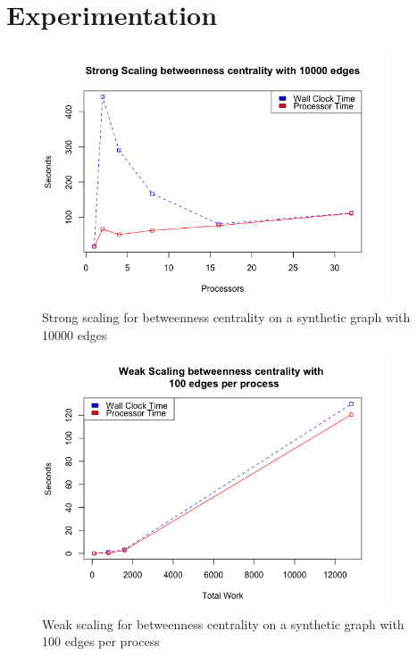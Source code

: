 \documentclass[11pt,a4paper,titlepage]{article}
\begin{document}
\section{Experimentation} %
\label{sec:methods}

\begin{figure}[h]
\centering
\includegraphics[width=0.9\textwidth]{figures/strong}
\caption{Strong scaling for betweenness centrality on a synthetic graph with
  10000 edges}
\end{figure}

\begin{figure}[h]
\centering
\includegraphics[width=0.9\textwidth]{figures/weak}
\caption{Weak scaling for betweenness centrality on a synthetic graph with
  100 edges per process}
\end{figure}
\end{document}
